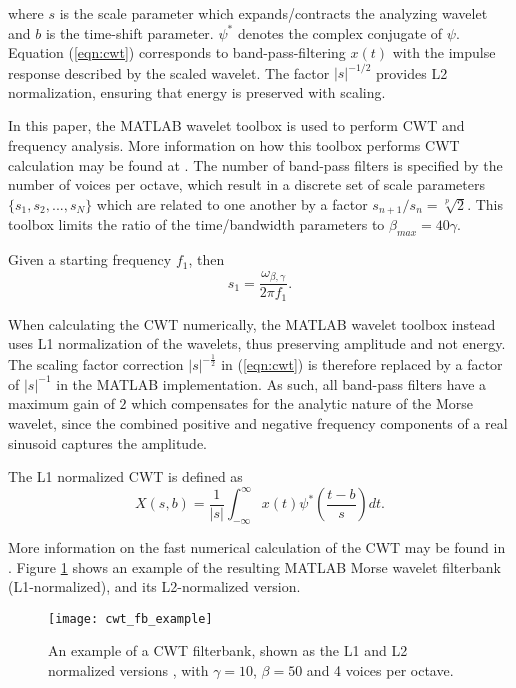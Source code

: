 \noindent where $s$ is the scale parameter which expands/contracts the analyzing wavelet and $b$ is the time-shift parameter.  $\psi^*$ denotes the complex conjugate of $\psi$. Equation (\ref{eqn:cwt}) corresponds to band-pass-filtering $x(t)$ with the impulse response described by the scaled wavelet. The factor $|s|^{-1/2}$ provides L2 normalization, ensuring that energy is preserved with scaling.

In this paper, the MATLAB wavelet toolbox is used to perform CWT and frequency analysis. More information on how this toolbox performs CWT calculation may be found at \citep{cwtmatlab}. The number of band-pass filters is specified by the number of voices per octave, which result in a discrete set of scale parameters $\{s_1, s_2, ..., s_N\}$ which are related to one another by a factor $s_{n+1} / s_n = \sqrt[p]{2}$. This toolbox limits the ratio of the time/bandwidth parameters to $\beta_{max} = 40\gamma$. 

Given a starting frequency $f_1$, then
\begin{equation*}
	s_1 =  \frac{\omega_{\beta,\gamma}}{2\pi  f_1 } .
\end{equation*}

When calculating the CWT numerically, the MATLAB wavelet toolbox instead uses L1 normalization of the wavelets, thus preserving amplitude and not energy. The  scaling factor correction $|s|^{-\frac{1}{2}}$ in (\ref{eqn:cwt}) is therefore replaced by a factor of $|s|^{-1}$ in the MATLAB implementation. As such, all band-pass filters have a maximum gain of $2$ which compensates for the analytic nature of the Morse wavelet, since the combined positive and negative frequency components of a real sinusoid captures the amplitude.

The L1 normalized CWT is defined as
\begin{equation}
	X(s,b) = \frac{1}{|s|} \int_{-\infty}^{\infty} x(t) \psi^*\left(\frac{t-b}{s}\right) dt.
\end{equation}




More information on the fast numerical calculation of the CWT may be found in \citep{fcwt}. Figure \ref{fig:cwt_fb_example} shows an example of the resulting MATLAB Morse wavelet filterbank (L1-normalized), and its L2-normalized version.

\begin{figure}[t]
	\centering
	\texttt{[image: cwt\_fb\_example]}
	\caption{An example of a CWT filterbank, shown as the L1 and L2 normalized versions , with $\gamma = 10$, $\beta=50$ and 4 voices per octave.}
	\label{fig:cwt_fb_example}
\end{figure}

